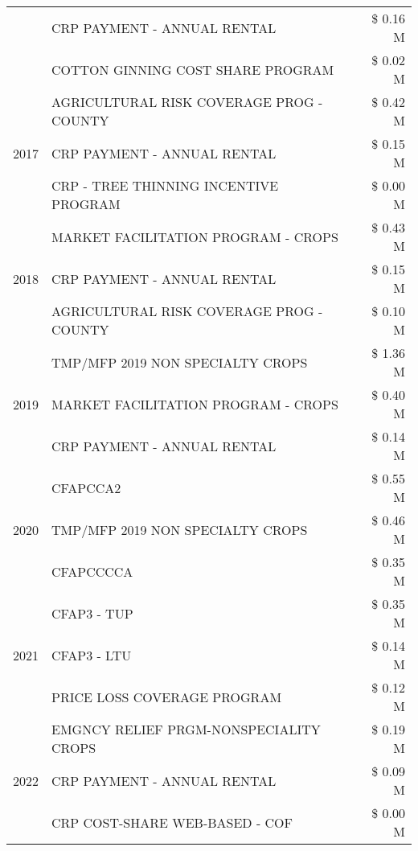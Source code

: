 \begin{tabular}{llr}
 & CRP PAYMENT - ANNUAL RENTAL & \$ 0.16 M \\
 & COTTON GINNING COST SHARE PROGRAM & \$ 0.02 M \\
\cline{1-3}
\multirow[t]{3}{*}{2017} & AGRICULTURAL RISK COVERAGE PROG - COUNTY & \$ 0.42 M \\
 & CRP PAYMENT - ANNUAL RENTAL & \$ 0.15 M \\
 & CRP - TREE THINNING INCENTIVE PROGRAM & \$ 0.00 M \\
\cline{1-3}
\multirow[t]{3}{*}{2018} & MARKET FACILITATION PROGRAM - CROPS & \$ 0.43 M \\
 & CRP PAYMENT - ANNUAL RENTAL & \$ 0.15 M \\
 & AGRICULTURAL RISK COVERAGE PROG - COUNTY & \$ 0.10 M \\
\cline{1-3}
\multirow[t]{3}{*}{2019} & TMP/MFP 2019 NON SPECIALTY CROPS & \$ 1.36 M \\
 & MARKET FACILITATION PROGRAM - CROPS & \$ 0.40 M \\
 & CRP PAYMENT - ANNUAL RENTAL & \$ 0.14 M \\
\cline{1-3}
\multirow[t]{3}{*}{2020} & CFAPCCA2 & \$ 0.55 M \\
 & TMP/MFP 2019 NON SPECIALTY CROPS & \$ 0.46 M \\
 & CFAPCCCCA & \$ 0.35 M \\
\cline{1-3}
\multirow[t]{3}{*}{2021} & CFAP3 - TUP & \$ 0.35 M \\
 & CFAP3 - LTU & \$ 0.14 M \\
 & PRICE LOSS COVERAGE PROGRAM & \$ 0.12 M \\
\cline{1-3}
\multirow[t]{3}{*}{2022} & EMGNCY RELIEF PRGM-NONSPECIALITY CROPS & \$ 0.19 M \\
 & CRP PAYMENT - ANNUAL RENTAL & \$ 0.09 M \\
 & CRP COST-SHARE WEB-BASED - COF & \$ 0.00 M \\
\cline{1-3}
\bottomrule
\end{tabular}
